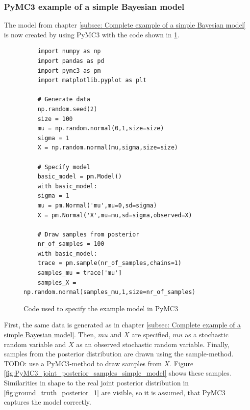 \documentclass{article}
\begin{document}
\subsubsection{PyMC3 example of a simple Bayesian model}
\label{subsec: PyMC3 example of a simple Bayesian model}
The model from chapter \ref{subsec: Complete example of a simple Bayesian model} is now created by using PyMC3 with the code shown in \ref{fig:PyMC3_example_code_simple_model}.
\begin{figure}[h]
	\begin{lstlisting}
	import numpy as np
	import pandas as pd
	import pymc3 as pm
	import matplotlib.pyplot as plt
	
	# Generate data
	np.random.seed(2)
	size = 100
	mu = np.random.normal(0,1,size=size)
	sigma = 1
	X = np.random.normal(mu,sigma,size=size)
	
	# Specify model
	basic_model = pm.Model()
	with basic_model:
	sigma = 1
	mu = pm.Normal('mu',mu=0,sd=sigma)
	X = pm.Normal('X',mu=mu,sd=sigma,observed=X)
	
	# Draw samples from posterior
	nr_of_samples = 100
	with basic_model:
	trace = pm.sample(nr_of_samples,chains=1)
	samples_mu = trace['mu']
	samples_X = np.random.normal(samples_mu,1,size=nr_of_samples)
	\end{lstlisting}
	\caption[Code used to specify the example model in PyMC3]{Code used to specify the example model in PyMC3}
	\label{fig:PyMC3_example_code_simple_model}
\end{figure}
First, the same data is generated as in chapter \ref{subsec: Complete example of a simple Bayesian model}. Then, $mu$ and $X$ are specified, $mu$ as a stochastic random variable and $X$ as an observed stochastic random variable. Finally, samples from the posterior distribution are drawn using the sample-method. TODO: use a PyMC3-method to draw samples from $X$.
Figure \ref{fig:PyMC3_joint_posterior_samples_simple_model} shows these samples. Similarities in shape to the real joint posterior distribution in \ref{fig:ground_truth_posterior_1} are visible, so it is assumed, that PyMC3 captures the model correctly.
\end{document}

